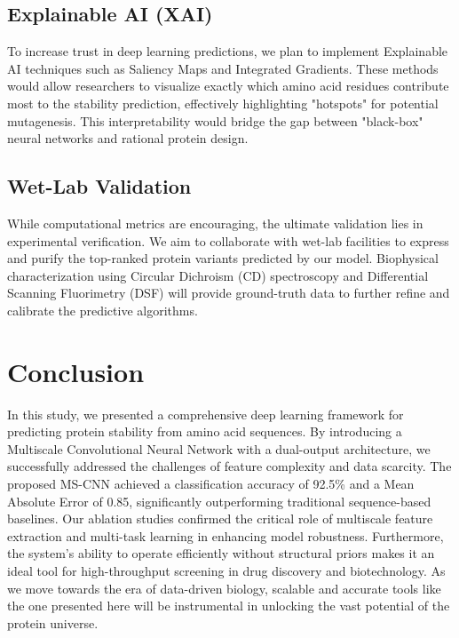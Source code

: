 \documentclass[conference]{IEEEtran}
\begin{document}
\subsection{Explainable AI (XAI)}
To increase trust in deep learning predictions, we plan to implement Explainable AI techniques such as Saliency Maps and Integrated Gradients. These methods would allow researchers to visualize exactly which amino acid residues contribute most to the stability prediction, effectively highlighting "hotspots" for potential mutagenesis. This interpretability would bridge the gap between "black-box" neural networks and rational protein design.

\subsection{Wet-Lab Validation}
While computational metrics are encouraging, the ultimate validation lies in experimental verification. We aim to collaborate with wet-lab facilities to express and purify the top-ranked protein variants predicted by our model. Biophysical characterization using Circular Dichroism (CD) spectroscopy and Differential Scanning Fluorimetry (DSF) will provide ground-truth data to further refine and calibrate the predictive algorithms.

\section{Conclusion}
In this study, we presented a comprehensive deep learning framework for predicting protein stability from amino acid sequences. By introducing a Multiscale Convolutional Neural Network with a dual-output architecture, we successfully addressed the challenges of feature complexity and data scarcity. The proposed MS-CNN achieved a classification accuracy of 92.5\% and a Mean Absolute Error of 0.85, significantly outperforming traditional sequence-based baselines.
Our ablation studies confirmed the critical role of multiscale feature extraction and multi-task learning in enhancing model robustness. Furthermore, the system's ability to operate efficiently without structural priors makes it an ideal tool for high-throughput screening in drug discovery and biotechnology. As we move towards the era of data-driven biology, scalable and accurate tools like the one presented here will be instrumental in unlocking the vast potential of the protein universe.
\end{document}
